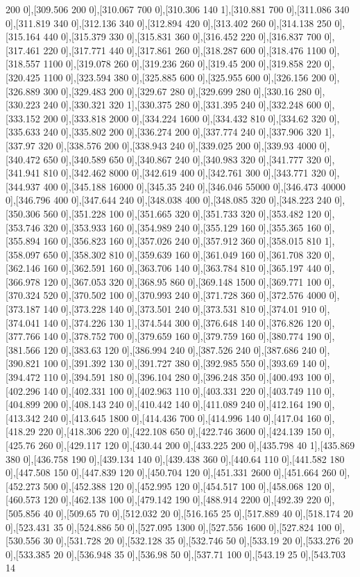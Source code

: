 {200 0],[309.506 200 0],[310.067 700 0],[310.306 140 1],[310.881 700 0],[311.086 340 0],[311.819 340 0],[312.136 340 0],[312.894 420 0],[313.402 260 0],[314.138 250 0],[315.164 440 0],[315.379 330 0],[315.831 360 0],[316.452 220 0],[316.837 700 0],[317.461 220 0],[317.771 440 0],[317.861 260 0],[318.287 600 0],[318.476 1100 0],[318.557 1100 0],[319.078 260 0],[319.236 260 0],[319.45 200 0],[319.858 220 0],[320.425 1100 0],[323.594 380 0],[325.885 600 0],[325.955 600 0],[326.156 200 0],[326.889 300 0],[329.483 200 0],[329.67 280 0],[329.699 280 0],[330.16 280 0],[330.223 240 0],[330.321 320 1],[330.375 280 0],[331.395 240 0],[332.248 600 0],[333.152 200 0],[333.818 2000 0],[334.224 1600 0],[334.432 810 0],[334.62 320 0],[335.633 240 0],[335.802 200 0],[336.274 200 0],[337.774 240 0],[337.906 320 1],[337.97 320 0],[338.576 200 0],[338.943 240 0],[339.025 200 0],[339.93 4000 0],[340.472 650 0],[340.589 650 0],[340.867 240 0],[340.983 320 0],[341.777 320 0],[341.941 810 0],[342.462 8000 0],[342.619 400 0],[342.761 300 0],[343.771 320 0],[344.937 400 0],[345.188 16000 0],[345.35 240 0],[346.046 55000 0],[346.473 40000 0],[346.796 400 0],[347.644 240 0],[348.038 400 0],[348.085 320 0],[348.223 240 0],[350.306 560 0],[351.228 100 0],[351.665 320 0],[351.733 320 0],[353.482 120 0],[353.746 320 0],[353.933 160 0],[354.989 240 0],[355.129 160 0],[355.365 160 0],[355.894 160 0],[356.823 160 0],[357.026 240 0],[357.912 360 0],[358.015 810 1],[358.097 650 0],[358.302 810 0],[359.639 160 0],[361.049 160 0],[361.708 320 0],[362.146 160 0],[362.591 160 0],[363.706 140 0],[363.784 810 0],[365.197 440 0],[366.978 120 0],[367.053 320 0],[368.95 860 0],[369.148 1500 0],[369.771 100 0],[370.324 520 0],[370.502 100 0],[370.993 240 0],[371.728 360 0],[372.576 4000 0],[373.187 140 0],[373.228 140 0],[373.501 240 0],[373.531 810 0],[374.01 910 0],[374.041 140 0],[374.226 130 1],[374.544 300 0],[376.648 140 0],[376.826 120 0],[377.766 140 0],[378.752 700 0],[379.659 160 0],[379.759 160 0],[380.774 190 0],[381.566 120 0],[383.63 120 0],[386.994 240 0],[387.526 240 0],[387.686 240 0],[390.821 100 0],[391.392 130 0],[391.727 380 0],[392.985 550 0],[393.69 140 0],[394.472 110 0],[394.591 180 0],[396.104 280 0],[396.248 350 0],[400.493 100 0],[402.296 140 0],[402.331 100 0],[402.963 110 0],[403.331 220 0],[403.749 110 0],[404.899 200 0],[408.143 240 0],[410.442 140 0],[411.089 240 0],[412.164 190 0],[413.342 240 0],[413.645 1800 0],[414.436 700 0],[414.996 140 0],[417.04 160 0],[418.29 220 0],[418.306 220 0],[422.108 650 0],[422.746 3600 0],[424.139 150 0],[425.76 260 0],[429.117 120 0],[430.44 200 0],[433.225 200 0],[435.798 40 1],[435.869 380 0],[436.758 190 0],[439.134 140 0],[439.438 360 0],[440.64 110 0],[441.582 180 0],[447.508 150 0],[447.839 120 0],[450.704 120 0],[451.331 2600 0],[451.664 260 0],[452.273 500 0],[452.388 120 0],[452.995 120 0],[454.517 100 0],[458.068 120 0],[460.573 120 0],[462.138 100 0],[479.142 190 0],[488.914 2200 0],[492.39 220 0],[505.856 40 0],[509.65 70 0],[512.032 20 0],[516.165 25 0],[517.889 40 0],[518.174 20 0],[523.431 35 0],[524.886 50 0],[527.095 1300 0],[527.556 1600 0],[527.824 100 0],[530.556 30 0],[531.728 20 0],[532.128 35 0],[532.746 50 0],[533.19 20 0],[533.276 20 0],[533.385 20 0],[536.948 35 0],[536.98 50 0],[537.71 100 0],[543.19 25 0],[543.703 14 }
